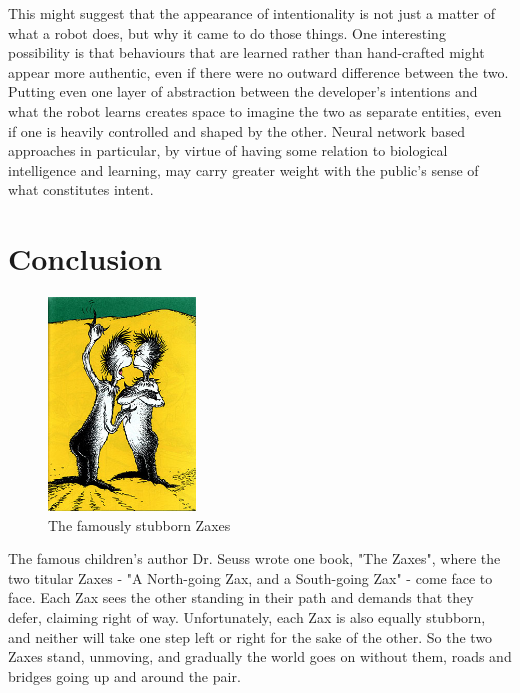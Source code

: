 \documentclass{sfuthesis}
\begin{document}
This might suggest that the appearance of intentionality is not just a matter of what a robot does, but why it came to do those things. One interesting possibility is that behaviours that are learned rather than hand-crafted might appear more authentic, even if there were no outward difference between the two. Putting even one layer of abstraction between the developer's intentions and what the robot learns creates space to imagine the two as separate entities, even if one is heavily controlled and shaped by the other. Neural network based approaches in particular, by virtue of having some relation to biological intelligence and learning, may carry greater weight with the public's sense of what constitutes intent. 


\section{Conclusion}

\begin{figure}
    \centering
    \includegraphics[width=0.35\textwidth]{Zax.jpg} 

    \caption{The famously stubborn Zaxes}
    \label{fig:zaxes}
\end{figure}

The famous children's author Dr. Seuss wrote one book, "The Zaxes", where the two titular Zaxes - "A North-going Zax, and a South-going Zax" - come face to face. Each Zax sees the other standing in their path and demands that they defer, claiming right of way. Unfortunately, each Zax is also equally stubborn, and neither will take one step left or right for the sake of the other. So the two Zaxes stand, unmoving, and gradually the world goes on without them, roads and bridges going up and around the pair.
\end{document}
